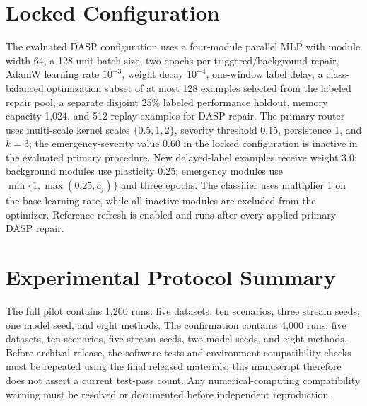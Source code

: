 \documentclass{ieeeaccess}
\begin{document}


\appendices

\section{Locked Configuration}
\label{app:config}
The evaluated DASP configuration uses a four-module parallel MLP with module width 64, a 128-unit batch size, two epochs per triggered/background repair, AdamW learning rate $10^{-3}$, weight decay $10^{-4}$, one-window label delay, a class-balanced optimization subset of at most 128 examples selected from the labeled repair pool, a separate disjoint 25\% labeled performance holdout, memory capacity 1,024, and 512 replay examples for DASP repair. The primary router uses multi-scale kernel scales $\{0.5,1,2\}$, severity threshold 0.15, persistence 1, and $k=3$; the emergency-severity value 0.60 in the locked configuration is inactive in the evaluated primary procedure. New delayed-label examples receive weight 3.0; background modules use plasticity 0.25; emergency modules use $\min\{1,\max(0.25,c_j)\}$ and three epochs. The classifier uses multiplier 1 on the base learning rate, while all inactive modules are excluded from the optimizer. Reference refresh is enabled and runs after every applied primary DASP repair.

\section{Experimental Protocol Summary}
The full pilot contains 1,200 runs: five datasets, ten scenarios, three stream seeds, one model seed, and eight methods. The confirmation contains 4,000 runs: five datasets, ten scenarios, five stream seeds, two model seeds, and eight methods. Before archival release, the software tests and environment-compatibility checks must be repeated using the final released materials; this manuscript therefore does not assert a current test-pass count. Any numerical-computing compatibility warning must be resolved or documented before independent reproduction.






\EOD
\end{document}
